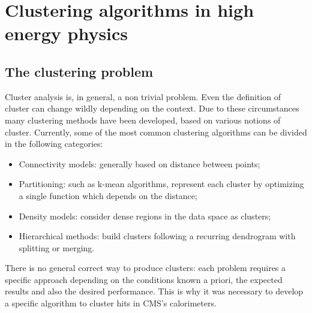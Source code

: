 \chapter{Clustering algorithms in high energy physics}
\label{ch:1}
\section{The clustering problem}
\label{ch:clustering_problem}
Cluster analysis is, in general, a non trivial problem. Even the definition of cluster can change wildly depending on the context. Due to these circumstances many clustering methods have been developed, based on various notions of cluster\cite{clustering}. Currently, some of the most common clustering algorithms can be divided in the following categories: 
\begin{itemize}
    \item Connectivity models: generally based on distance between points;
    \item Partitioning: such as k-mean algorithms, represent each cluster by optimizing a single function which depends on the distance\cite{k-mean};
    \item Density models: consider dense regions in the data space as clusters;
    \item Hierarchical methods: build clusters following a recurring dendrogram with splitting or merging.
\end{itemize}
There is no general correct way to produce clusters: each problem requires a specific approach depending on the conditions known a priori, the expected results and also the desired performance. This is why it was necessary to develop a specific algorithm to cluster hits in CMS's calorimeters.

